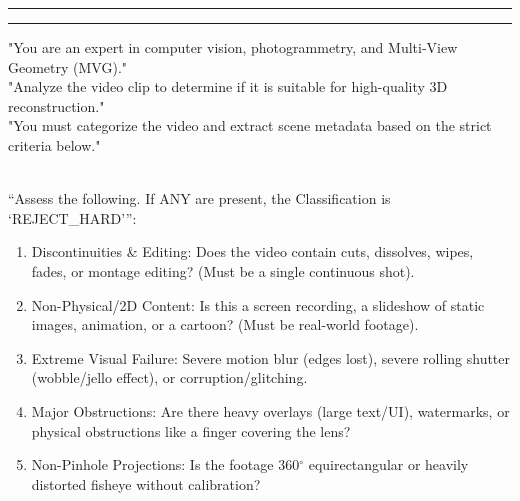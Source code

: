 {
  \vspace{1em}
  \color{linegreen}
  \hrule
  \vspace{1pt}
  \hrule
  \vspace{0.5em}
}

\begingroup

\color{promptcolor} \ttfamily \footnotesize \raggedright
\noindent
"You are an expert in computer vision, photogrammetry, and Multi-View Geometry (MVG)."\\
"Analyze the video clip to determine if it is suitable for high-quality 3D reconstruction."\\
"You must categorize the video and extract scene metadata based on the strict criteria below."

\vspace{0.5em}
 \\
``Assess the following. If ANY are present, the Classification is {`REJECT\_HARD'}'':
\begin{enumerate}[noitemsep, topsep=0pt, leftmargin=*]
    \item Discontinuities \& Editing: Does the video contain cuts, dissolves, wipes, fades, or montage editing? (Must be a single continuous shot).
    \item Non-Physical/2D Content: Is this a screen recording, a slideshow of static images, animation, or a cartoon? (Must be real-world footage).
    \item Extreme Visual Failure: Severe motion blur (edges lost), severe rolling shutter (wobble/jello effect), or corruption/glitching.
    \item Major Obstructions: Are there heavy overlays (large text/UI), watermarks, or physical obstructions like a finger covering the lens?
    \item Non-Pinhole Projections: Is the footage 360$^{\circ}$ equirectangular or heavily distorted fisheye without calibration?
\end{enumerate}

